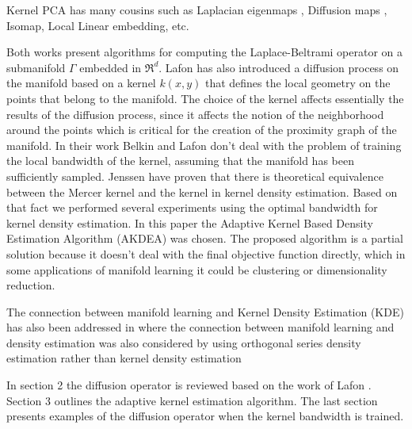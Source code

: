 \documentclass[12pt,letterpaper,doublespaced,ETD,dvips,proposal]{gtthesis}
\begin{document}
\begin{Body}
Kernel PCA has many cousins such as Laplacian eigenmaps
\cite{Belkin}, Diffusion maps  \cite{Lafon}, Isomap, Local Linear
embedding, etc.

Both works present algorithms for computing the Laplace-Beltrami
operator on a submanifold $\Gamma$ embedded in $\Re^d$. Lafon has
also introduced a diffusion process on the manifold based on a
kernel $k(x,y)$ that defines the local geometry on the points that
belong to the manifold. The choice of the kernel affects essentially
the results of the diffusion process, since it affects the notion of
the neighborhood around the points which is critical for the
creation of the proximity graph of the manifold. In their work
Belkin and Lafon don't deal with the problem of training the local
bandwidth of the kernel, assuming that the manifold has been
sufficiently sampled. Jenssen \cite{jenssen17lpd} have proven  that
there is theoretical equivalence between the Mercer kernel and the
kernel in kernel density estimation. Based on that fact we performed
several experiments using the optimal bandwidth for kernel density
estimation. In this paper the Adaptive Kernel Based Density
Estimation Algorithm (AKDEA) \cite{Silverman} was chosen. The
proposed algorithm is a partial solution because it doesn't deal
with the final objective function directly, which in some
applications of manifold learning it could be clustering or
dimensionality reduction.

 The connection between manifold learning and Kernel Density Estimation (KDE) has also been addressed
in \cite{girolami2002osd} where the connection between manifold
learning and density estimation was also considered by using
orthogonal series density estimation rather than kernel density
estimation

In  section 2 the diffusion operator is reviewed based on the work
of Lafon \cite{Lafon}. Section 3 outlines the adaptive kernel
estimation algorithm. The last section presents examples of the
diffusion operator when the kernel bandwidth is trained.


\end{Body}
\end{document}
